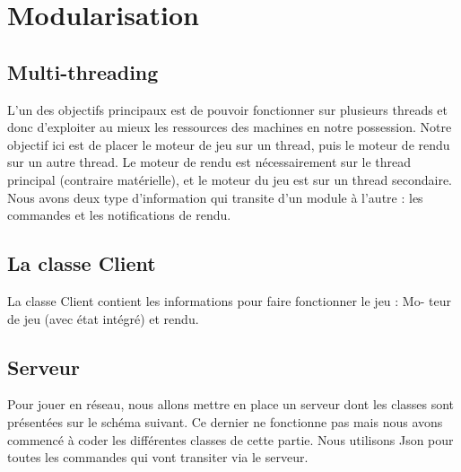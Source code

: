 \section{Modularisation}

\subsection{Multi-threading}

L'un des objectifs principaux est de pouvoir fonctionner sur plusieurs threads et donc d'exploiter au mieux les ressources des machines en notre possession. 
Notre objectif ici est de placer le moteur de jeu sur un thread, puis le moteur de rendu sur un autre
thread. Le moteur de rendu est nécessairement sur le thread principal (contraire matérielle), et le moteur
du jeu est sur un thread secondaire. Nous avons deux type d’information qui transite d’un module à l’autre :
les commandes et les notifications de rendu.

\subsection{La classe Client}

La classe Client contient les informations pour faire fonctionner le jeu : Mo-
teur de jeu (avec état intégré) et rendu.

\subsection{Serveur}

Pour jouer en réseau, nous allons mettre en place un serveur dont les classes sont présentées sur le schéma suivant. Ce dernier ne fonctionne pas mais nous avons commencé à coder les différentes classes de cette partie. 
Nous utilisons Json pour toutes les commandes qui vont transiter via le serveur. 


